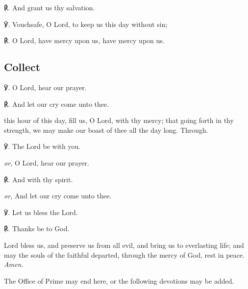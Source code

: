 \begin{multicols}{2}
℟. And grant us thy salvation.

℣. Vouchsafe, O Lord, to keep us this day without sin;

℟. O Lord, have mercy upon us, have mercy upon us.

\subsection{Collect}
℣. O Lord, hear our prayer.

℟. And let our cry come unto thee.

 this hour of this day, fill us, O Lord, with thy mercy; that going forth in thy strength, we may make our boast of thee all the day long. Through.

℣. The Lord be with you.\par
\textit{or,} O Lord, hear our prayer.

℟. And with thy spirit.\par
\textit{or,} And let our cry come unto thee.

℣. Let us bless the Lord.

℟. Thanks be to God.

 Lord bless us, and preserve us from all evil, and bring us to everlasting life; and may the souls {} of the faithful departed, through the mercy of God, rest in peace. \textit{Amen.}
\end{multicols}

\begin{rubric}
	The Office of Prime may end here, or the following devotions may be added.
\end{rubric}